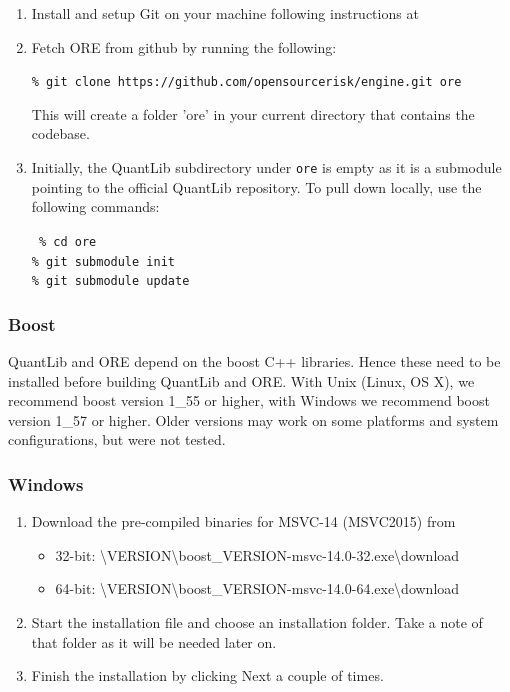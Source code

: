 \documentclass[12pt, a4paper]{article}
\newcommand{\bs}{\textbackslash}
\begin{document}
\begin{enumerate}
\item Install and setup Git on your machine following instructions at \cite{git-download}

\item Fetch ORE from github by running the following: 

{\tt\% git clone https://github.com/opensourcerisk/engine.git ore}      

This will create a folder 'ore' in your current directory that contains the codebase.

\item Initially, the QuantLib subdirectory under {\tt ore} is empty as it is a submodule pointing to the official
  QuantLib repository. To pull down locally, use the following commands:

{\tt
\% cd ore \\
\% git submodule init \\
\% git submodule update
}

\end{enumerate}

\subsubsection{Boost}\label{sec:boost}

QuantLib and ORE depend on the boost C++ libraries. Hence these need to be installed before building QuantLib and
ORE. With Unix (Linux, OS X), we recommend boost version 1\_55 or higher, with Windows we recommend boost version 1\_57
or higher. Older versions may work on some platforms and system configurations, but were not tested.

\subsubsection*{Windows}

\begin{enumerate}
\item Download the pre-compiled binaries for MSVC-14 (MSVC2015) from \cite{boost-binaries}
\begin{itemize}
\item 32-bit: \cite{boost-binaries}{\bs}VERSION{\bs}boost\_VERSION-msvc-14.0-32.exe{\bs}download 
\item 64-bit: \cite{boost-binaries}{\bs}VERSION{\bs}boost\_VERSION-msvc-14.0-64.exe{\bs}download
\end{itemize}
\item Start the installation file and choose an installation folder. Take a note of that folder as it will be needed
  later on.
\item Finish the installation by clicking Next a couple of times.
\end{enumerate}
    
\end{document}
